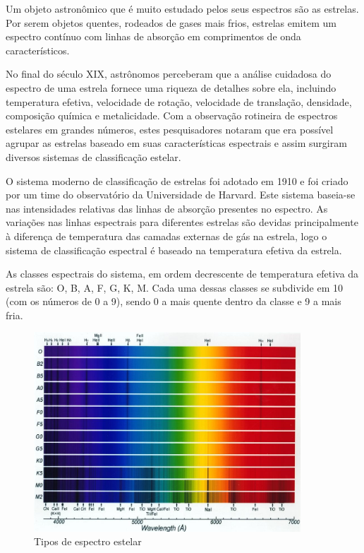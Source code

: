 Um objeto astronômico que é muito estudado pelos seus espectros são as estrelas. Por serem objetos quentes, rodeados de gases mais frios, estrelas emitem um espectro contínuo com linhas de absorção em comprimentos de onda característicos.

No final do século XIX, astrônomos perceberam que a análise cuidadosa do espectro de uma estrela fornece uma riqueza de detalhes sobre ela, incluindo temperatura efetiva, velocidade de rotação, velocidade de translação, densidade, composição química e metalicidade. Com a observação rotineira de espectros estelares em grandes números, estes pesquisadores notaram que era possível agrupar as estrelas baseado em suas características espectrais e assim surgiram diversos sistemas de classificação estelar. 

O sistema moderno de classificação de estrelas foi adotado em 1910 e foi criado por um time do observatório da Universidade de Harvard. Este sistema baseia-se nas intensidades relativas das linhas de absorção presentes no espectro. As variações nas linhas espectrais para diferentes estrelas são devidas principalmente à diferença de temperatura das camadas externas de gás na estrela, logo o sistema de classificação espectral é baseado na temperatura efetiva da estrela. 

As classes espectrais do sistema, em ordem decrescente de temperatura efetiva da estrela são: O, B, A, F, G, K, M. Cada uma dessas classes se subdivide em 10 (com os números de 0 a 9), sendo 0 a mais quente dentro da classe e 9 a mais fria.

\begin{figure}[htb]
\centering
\includegraphics[width=10cm]{figuras/Spectra_Briley.jpg}
\caption{Tipos de espectro estelar}
\label{fig:stellar-spectrum-types}
\end{figure}

